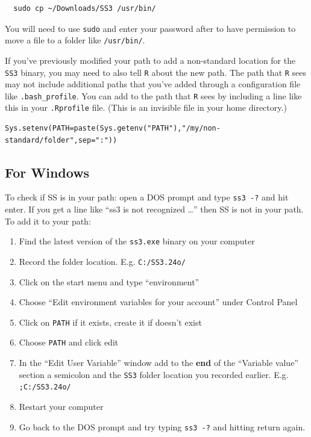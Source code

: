 \documentclass[12pt]{article}
\begin{document}
\begin{verbatim}
  sudo cp ~/Downloads/SS3 /usr/bin/
\end{verbatim}

\noindent
You will need to use \texttt{sudo} and enter your password after to have 
permission to move a file to a folder like \texttt{/usr/bin/}.

If you've previously modified your path to add a non-standard location for the 
\texttt{SS3} binary, you may need to also tell \texttt{R} about the new path. 
The path that \texttt{R} sees may not include additional paths that you've 
added through a configuration file like \texttt{.bash\_profile}. You can add to 
the path that \texttt{R} sees by including a line like this in your 
\texttt{.Rprofile} file. (This is an invisible file in your home directory.)

\begin{verbatim}
Sys.setenv(PATH=paste(Sys.getenv("PATH"),"/my/non-standard/folder",sep=":")) 
\end{verbatim}

\subsection{For Windows}
To check if SS is in your path: open a DOS prompt and type \texttt{ss3 -?} and 
hit enter. If you get a line like ``ss3 is not recognized \ldots'' then SS is 
not in your path. To add it to your path:

\begin{enumerate}
  \item Find the latest version of the \texttt{ss3.exe} binary on your computer
  \item Record the folder location. E.g. \texttt{C:/SS3.24o/}
  \item Click on the start menu and type ``environment''
  \item Choose ``Edit environment variables for your account'' under Control 
    Panel
  \item Click on \texttt{PATH} if it exists, create it if doesn't exist
  \item Choose \texttt{PATH} and click edit
  \item In the ``Edit User Variable'' window add to the \textbf{end} of the 
    ``Variable value'' section a semicolon and the \texttt{SS3} folder location you 
    recorded earlier. E.g. \texttt{;C:/SS3.24o/}
  \item Restart your computer
  \item Go back to the DOS prompt and try typing \texttt{ss3 -?} and hitting 
    return again.
\end{enumerate}
\end{document}
